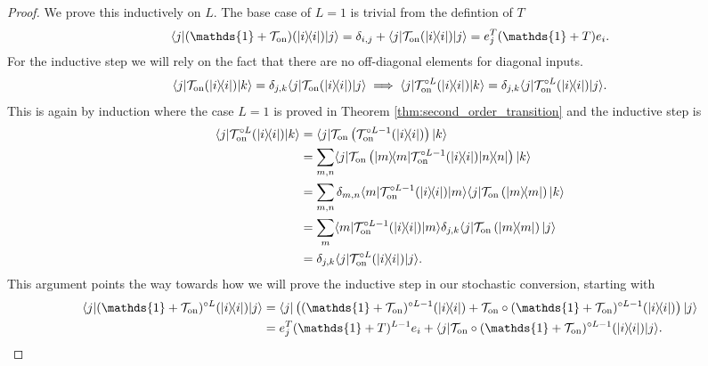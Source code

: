\documentclass{article}
\newcommand{\on}{\rm on}
\newcommand{\ket}[1]{|#1\rangle}
\newcommand{\bra}[1]{\langle #1|}
\newcommand{\ketbra}[2]{| #1\rangle\! \langle #2|}
\newcommand{\identity}{\mathds{1}}
\begin{document}
\begin{proof}
    We prove this inductively on $L$. The base case of $L = 1$ is trivial from the defintion of $T$
    \begin{align}
    \bra{j} (\identity + \mathcal{T}_{\on})(\ketbra{i}{i}) \ket{j} = \delta_{i,j} + \bra{j} \mathcal{T}_{\on}(\ketbra{i}{i}) \ket{j} = e_j^T (\identity +  T) e_i.
\end{align}
For the inductive step we will rely on the fact that there are no off-diagonal elements for diagonal inputs. 
\begin{align}
    \bra{j} \mathcal{T}_{\on} (\ketbra{i}{i}) \ket{k} = \delta_{j,k} \bra{j} \mathcal{T}_{\on} (\ketbra{i}{i}) \ket{j} \implies \bra{j} \mathcal{T}_{\on}^{\circ L} (\ketbra{i}{i}) \ket{k} = \delta_{j,k} \bra{j} \mathcal{T}_{\on}^{\circ L} (\ketbra{i}{i}) \ket{j}.
\end{align}
This is again by induction where the case $L = 1$ is proved in Theorem \ref{thm:second_order_transition} and the inductive step is 
\begin{align}
    \bra{j} \mathcal{T}_{\on}^{\circ L} (\ketbra{i}{i}) \ket{k} &= \bra{j} \mathcal{T}_{\on} \left( \mathcal{T}_{\on}^{\circ L - 1} (\ketbra{i}{i}) \right) \ket{k} \\
    &= \sum_{m, n} \bra{j} \mathcal{T}_{\on}\left( \ketbra{m}{m}\mathcal{T}_{\on}^{\circ L - 1}(\ketbra{i}{i}) \ketbra{n}{n}\right) \ket{k} \\
    &= \sum_{m, n} \delta_{m,n} \bra{m}\mathcal{T}_{\on}^{\circ L - 1}(\ketbra{i}{i}) \ket{m} \bra{j} \mathcal{T}_{\on}\left(   \ketbra{m}{m} \right) \ket{k} \\
    &= \sum_{m} \bra{m}\mathcal{T}_{\on}^{\circ L - 1}(\ketbra{i}{i}) \ket{m} \delta_{j,k} \bra{j} \mathcal{T}_{\on}\left(   \ketbra{m}{m} \right) \ket{j} \\
    &= \delta_{j,k} \bra{j} \mathcal{T}_{\on}^{\circ L} (\ketbra{i}{i}) \ket{j}.
\end{align} 
This argument points the way towards how we will prove the inductive step in our stochastic conversion, starting with
\begin{align}
    \bra{j} (\identity + \mathcal{T}_{\on})^{\circ L}(\ketbra{i}{i}) \ket{j} &= \bra{j} \left( (\identity + \mathcal{T}_{\on})^{\circ L - 1} (\ketbra{i}{i}) + \mathcal{T}_{\on} \circ (\identity + \mathcal{T}_{\on})^{\circ L - 1} (\ketbra{i}{i}) \right)\ket{j} \\
    &= e_j^T (\identity + T)^{L - 1} e_i + \bra{j} \mathcal{T}_{\on} \circ (\identity + \mathcal{T}_{\on})^{\circ L - 1} (\ketbra{i}{i}) \ket{j} . \label{eq:matrix_reloaded1}

\end{align}
\end{proof}
\end{document}
